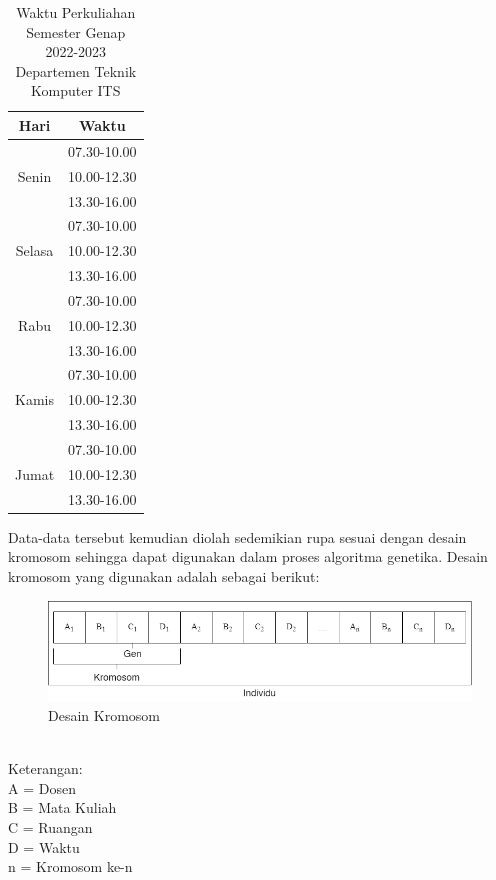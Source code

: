 \begin{longtable}[c]{|c|c|}
  \caption{Waktu Perkuliahan Semester Genap 2022-2023 Departemen Teknik Komputer ITS}
  \label{waktu}\\
  \hline
  \rowcolor[HTML]{D0CECE} 
  Hari                    & Waktu       \\ \hline
  \multirow{3}{*}{Senin}  & 07.30-10.00 \\ \cline{2-2} 
                          & 10.00-12.30 \\ \cline{2-2} 
                          & 13.30-16.00 \\ \hline
  \multirow{3}{*}{Selasa} & 07.30-10.00 \\ \cline{2-2} 
                          & 10.00-12.30 \\ \cline{2-2} 
                          & 13.30-16.00 \\ \hline
  \multirow{3}{*}{Rabu}   & 07.30-10.00 \\ \cline{2-2} 
                          & 10.00-12.30 \\ \cline{2-2} 
                          & 13.30-16.00 \\ \hline
  \multirow{3}{*}{Kamis}  & 07.30-10.00 \\ \cline{2-2} 
                          & 10.00-12.30 \\ \cline{2-2} 
                          & 13.30-16.00 \\ \hline
  \multirow{3}{*}{Jumat}  & 07.30-10.00 \\ \cline{2-2} 
                          & 10.00-12.30 \\ \cline{2-2} 
                          & 13.30-16.00 \\ \hline
  \end{longtable}
  Data-data tersebut kemudian diolah sedemikian rupa sesuai dengan desain kromosom \linebreak sehingga dapat digunakan dalam proses algoritma genetika. Desain kromosom yang digunakan adalah sebagai berikut:
\begin{figure} [ht] \centering
    \includegraphics[scale=0.5]{gambar/kromosom.png}
    \caption{Desain Kromosom}
    \label{fig:kromosom}
\end{figure}\\
  Keterangan:\\
  A = Dosen\\
  B = Mata Kuliah\\
  C = Ruangan\\
  D = Waktu\\
  n = Kromosom ke-n

